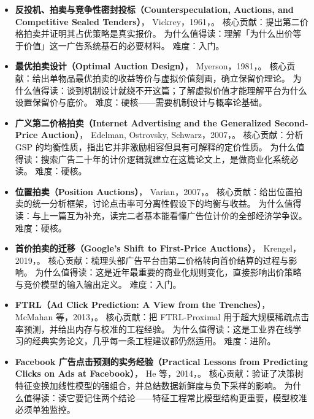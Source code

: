 \begin{itemize}
  \item \textbf{反投机、拍卖与竞争性密封投标（Counterspeculation, Auctions, and Competitive Sealed Tenders）}，
        Vickrey，1961，\cite{vickrey1961counterspeculation}。
        核心贡献：提出第二价格拍卖并证明其占优策略是真实报价。
        为什么值得读：理解「为什么出价等于价值」这一广告系统基石的必要材料。
        难度：入门。
  \item \textbf{最优拍卖设计（Optimal Auction Design）}，
        Myerson，1981，\cite{myerson1981optimal}。
        核心贡献：给出单物品最优拍卖的收益等价与虚拟价值刻画，确立保留价理论。
        为什么值得读：谈到机制设计就绕不开这篇；了解虚拟价值才能理解平台为什么设置保留价与底价。
        难度：硬核——需要机制设计与概率论基础。
  \item \textbf{广义第二价格拍卖（Internet Advertising and the Generalized Second-Price Auction）}，
        Edelman, Ostrovsky, Schwarz，2007，\cite{edelman2007gsp}。
        核心贡献：分析 GSP 的均衡性质，指出它并非激励相容但具有可解释的定价性质。
        为什么值得读：搜索广告二十年的计价逻辑就建立在这篇论文上，是做商业化系统必读。
        难度：硬核。
  \item \textbf{位置拍卖（Position Auctions）}，
        Varian，2007，\cite{varian2007position}。
        核心贡献：给出位置拍卖的统一分析框架，讨论点击率可分离性假设下的均衡与收益。
        为什么值得读：与上一篇互为补充，读完二者基本能看懂广告位计价的全部经济学争议。
        难度：硬核。
  \item \textbf{首价拍卖的迁移（Google's Shift to First-Price Auctions）}，
        Krengel，2019，\cite{krengel2019firstprice}。
        核心贡献：梳理头部广告平台由第二价格转向首价结算的过程与影响。
        为什么值得读：这是近年最重要的商业化规则变化，直接影响出价策略与竞价模型的输入输出定义。
        难度：入门。
  \item \textbf{FTRL（Ad Click Prediction: A View from the Trenches）}，
        McMahan 等，2013，\cite{mcmahan2013ftrl}。
        核心贡献：把 FTRL-Proximal 用于超大规模稀疏点击率预测，并给出内存与校准的工程经验。
        为什么值得读：这是工业界在线学习的经典实务论文，几乎每一条工程建议都仍然适用。
        难度：进阶。
  \item \textbf{Facebook 广告点击预测的实务经验（Practical Lessons from Predicting Clicks on Ads at Facebook）}，
        He 等，2014，\cite{he2014practical}。
        核心贡献：验证了决策树特征变换加线性模型的强组合，并总结数据新鲜度与负下采样的影响。
        为什么值得读：读它要记住两个结论——特征工程常比模型结构更重要，模型校准必须单独监控。

\end{itemize}
